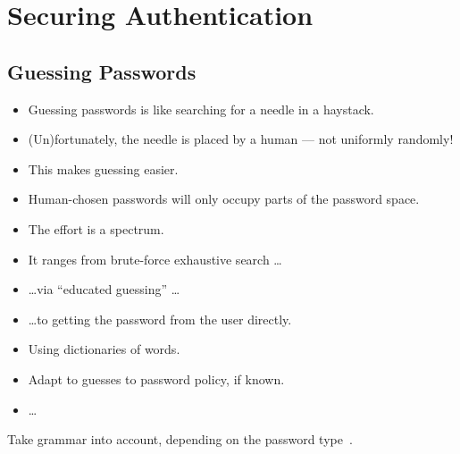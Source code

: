 \section[Securing]{Securing Authentication}

\subsection{Guessing Passwords}

\begin{frame}
  \begin{itemize}
    \item Guessing passwords is like searching for a needle in a haystack.

      \pause{}

    \item (Un)fortunately, the needle is placed by a human --- not uniformly 
      randomly!
    \item This makes guessing easier.
    \item Human-chosen passwords will only occupy parts of the password space.
  \end{itemize}
\end{frame}

\begin{frame}
  \begin{itemize}
    \item The effort is a spectrum.

    \item It ranges from brute-force exhaustive search \dots

      \pause{}

    \item \dots via \enquote{educated guessing} \dots

      \pause{}

    \item \dots to getting the password from the user directly.
  \end{itemize}
\end{frame}

\begin{frame}
  \begin{example}
    \begin{itemize}
      \item Using dictionaries of words.
      \item Adapt to guesses to password policy, if known.
      \item \dots
    \end{itemize}
  \end{example}

  \pause{}

  \begin{example}
    Take grammar into account, depending on the password 
    type~\cite{Bonneau2012ghs,Bonneau2012lpo}.
  \end{example}
\end{frame}

